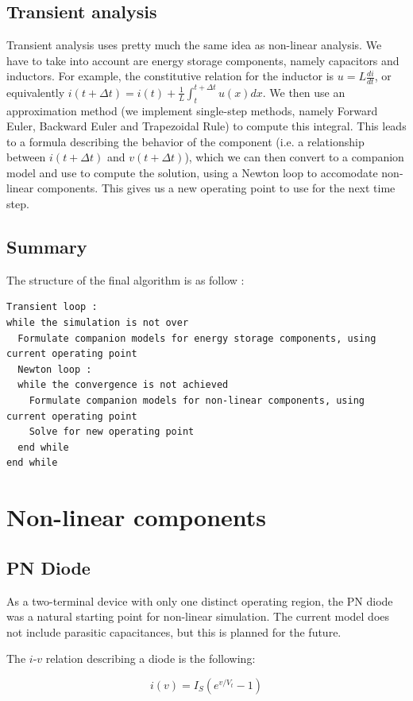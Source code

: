 \documentclass{article}
\begin{document}
\subsection{Transient analysis}
Transient analysis uses pretty much the same idea as non-linear analysis. We have to take into account are energy storage components, namely capacitors and inductors. For example, the constitutive relation for the inductor is $u = L \frac{di}{dt}$, or equivalently $i(t+\Delta t) = i(t) + \frac{1}{L} \int_t^{t+\Delta t} u(x) dx$. We then use an approximation method (we implement single-step methods, namely Forward Euler, Backward Euler and Trapezoidal Rule) to compute this integral. This leads to a formula describing the behavior of the component (i.e. a relationship between $i(t+\Delta t)$ and $v(t+\Delta t)$), which we can then convert to a companion model and use to compute the solution, using a Newton loop to accomodate non-linear components. This gives us a new operating point to use for the next time step.
\subsection{Summary}
The structure of the final algorithm is as follow :
\begin{lstlisting}
Transient loop :
while the simulation is not over
  Formulate companion models for energy storage components, using current operating point
  Newton loop :
  while the convergence is not achieved
    Formulate companion models for non-linear components, using current operating point
    Solve for new operating point
  end while
end while
\end{lstlisting}
\section{Non-linear components}
\subsection{PN Diode}

As a two-terminal device with only one distinct operating region, the PN diode was a natural starting point for non-linear simulation.  The current model does not include parasitic capacitances, but this is planned for the future.

The $i$-$v$ relation describing a diode is the following:

\begin{equation}
i(v) = I_S(e^{v/V_t}-1)
\end{equation}
\end{document}
